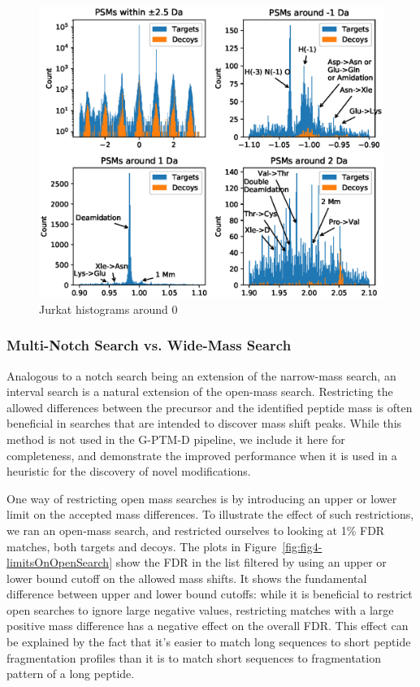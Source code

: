 \documentclass[journal=jprobs,manuscript=article]{achemso}
\begin{document}
\begin{figure}
\caption{Jurkat histograms around 0}
\label{fig:fig3jurkat-1012}
\includegraphics{fig3jurkat-1012}
\end{figure}



\subsubsection{Multi-Notch Search vs. Wide-Mass Search}

Analogous to a notch search being an extension of the narrow-mass search, an interval search is a natural extension of the open-mass search.
Restricting the allowed differences between the precursor and the identified peptide mass is often beneficial in searches that are intended to discover mass shift peaks.
While this method is not used in the G-PTM-D pipeline, we include it here for completeness, and demonstrate the improved performance when it is used in a heuristic for the discovery of novel modifications.

One way of restricting open mass searches is by introducing an upper or lower limit on the accepted mass differences.
To illustrate the effect of such restrictions, we ran an open-mass search, and restricted ourselves to looking at 1\% FDR matches, both targets and decoys.
The plots in Figure~\ref{fig:fig4-limitsOnOpenSearch} show the FDR in the list filtered by using an upper or lower bound cutoff on the allowed mass shifts.
It shows the fundamental difference between upper and lower bound cutoffs: while it is beneficial to restrict open searches to ignore large negative values, restricting matches with a large positive mass difference has a negative effect on the overall FDR. This effect can be explained by the fact that it's easier to match long sequences to short peptide fragmentation profiles than it is to match short sequences to fragmentation pattern of a long peptide.
\end{document}
